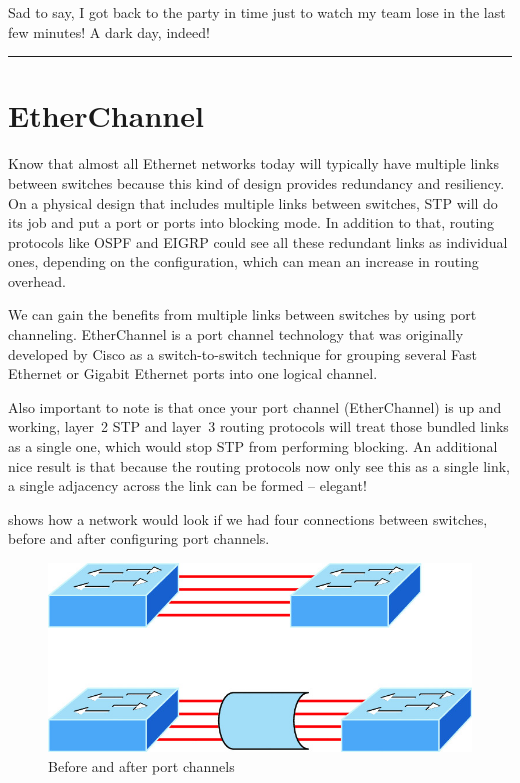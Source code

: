 Sad to say, I got back to the party in time just to watch my team lose
in the last few minutes! A dark day, indeed!

\begin{center}\rule{0.5\linewidth}{0.5pt}\end{center}



\section{EtherChannel}
\label{sec:etherchannel}

Know that almost all Ethernet networks today will typically have
multiple links between switches because this kind of design provides
redundancy and resiliency. On a physical design that includes multiple
links between switches, STP will do its job and put a port or ports into
blocking mode. In addition to that, routing protocols like OSPF and
EIGRP could see all these redundant links as individual ones, depending
on the configuration, which can mean an increase in routing overhead.

We can gain the benefits from multiple links between switches by using
port channeling. EtherChannel is a port channel technology that was
originally developed by Cisco as a switch-to-switch technique for
grouping several Fast Ethernet or Gigabit Ethernet ports into one
logical channel.

Also important to note is that once your port channel (EtherChannel) is
up and working, layer~2 STP and layer~3 routing protocols will treat
those bundled links as a single one, which would stop STP from
performing blocking. An additional nice result is that because the
routing protocols now only see this as a single link, a single adjacency
across the link can be formed -- elegant!

 shows how a network would look if we had four connections between switches, before and after configuring port channels.

\begin{figure}
   \centering
   \includegraphics[width=.5\textwidth]{images/c15f020.jpg}
   \caption{Before and after port channels}
   \label{fig:etherchannel-before-after}
\end{figure}

